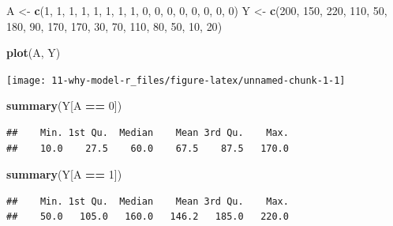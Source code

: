 \documentclass[
  10pt,
]{book}
\newenvironment{Shaded}{\begin{snugshade}}{\end{snugshade}}
\newcommand{\DecValTok}[1]{\textcolor[rgb]{0.00,0.00,0.81}{#1}}
\newcommand{\KeywordTok}[1]{\textcolor[rgb]{0.13,0.29,0.53}{\textbf{#1}}}
\newcommand{\NormalTok}[1]{#1}
\newcommand{\OperatorTok}[1]{\textcolor[rgb]{0.81,0.36,0.00}{\textbf{#1}}}
\newcommand{\StringTok}[1]{\textcolor[rgb]{0.31,0.60,0.02}{#1}}
\begin{document}
\begin{Shaded}
\begin{Highlighting}[]
\NormalTok{A <-}\StringTok{ }\KeywordTok{c}\NormalTok{(}\DecValTok{1}\NormalTok{, }\DecValTok{1}\NormalTok{, }\DecValTok{1}\NormalTok{, }\DecValTok{1}\NormalTok{, }\DecValTok{1}\NormalTok{, }\DecValTok{1}\NormalTok{, }\DecValTok{1}\NormalTok{, }\DecValTok{1}\NormalTok{, }\DecValTok{0}\NormalTok{, }\DecValTok{0}\NormalTok{, }\DecValTok{0}\NormalTok{, }\DecValTok{0}\NormalTok{, }\DecValTok{0}\NormalTok{, }\DecValTok{0}\NormalTok{, }\DecValTok{0}\NormalTok{, }\DecValTok{0}\NormalTok{)}
\NormalTok{Y <-}\StringTok{ }\KeywordTok{c}\NormalTok{(}\DecValTok{200}\NormalTok{, }\DecValTok{150}\NormalTok{, }\DecValTok{220}\NormalTok{, }\DecValTok{110}\NormalTok{, }\DecValTok{50}\NormalTok{, }\DecValTok{180}\NormalTok{, }\DecValTok{90}\NormalTok{, }\DecValTok{170}\NormalTok{, }\DecValTok{170}\NormalTok{, }\DecValTok{30}\NormalTok{,}
       \DecValTok{70}\NormalTok{, }\DecValTok{110}\NormalTok{, }\DecValTok{80}\NormalTok{, }\DecValTok{50}\NormalTok{, }\DecValTok{10}\NormalTok{, }\DecValTok{20}\NormalTok{)}

\KeywordTok{plot}\NormalTok{(A, Y)}
\end{Highlighting}
\end{Shaded}

\begin{center}\texttt{[image: 11-why-model-r\_files/figure-latex/unnamed-chunk-1-1]} \end{center}

\begin{Shaded}
\begin{Highlighting}[]
\KeywordTok{summary}\NormalTok{(Y[A }\OperatorTok{==}\StringTok{ }\DecValTok{0}\NormalTok{])}
\end{Highlighting}
\end{Shaded}

\begin{verbatim}
##    Min. 1st Qu.  Median    Mean 3rd Qu.    Max. 
##    10.0    27.5    60.0    67.5    87.5   170.0
\end{verbatim}

\begin{Shaded}
\begin{Highlighting}[]
\KeywordTok{summary}\NormalTok{(Y[A }\OperatorTok{==}\StringTok{ }\DecValTok{1}\NormalTok{])}
\end{Highlighting}
\end{Shaded}

\begin{verbatim}
##    Min. 1st Qu.  Median    Mean 3rd Qu.    Max. 
##    50.0   105.0   160.0   146.2   185.0   220.0
\end{verbatim}
\end{document}

